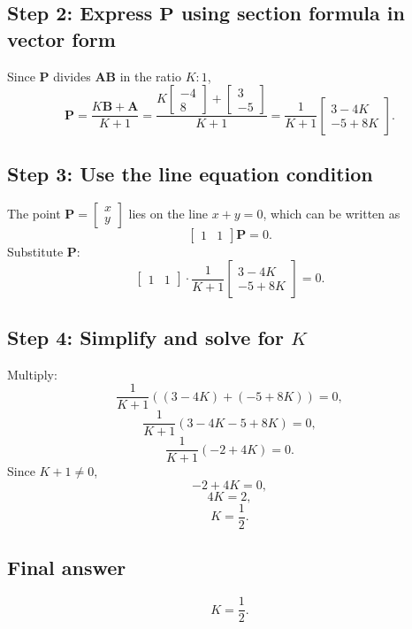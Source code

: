 \documentclass[journal]{IEEEtran}
\begin{document}
\subsection*{\textbf{Step 2: Express \(\mathbf{P}\) using section formula in vector form}}
Since \(\mathbf{P}\) divides \(\mathbf{AB}\) in the ratio \(K : 1\), 
\[
\mathbf{P} = \frac{K \mathbf{B} + \mathbf{A}}{K + 1} = \frac{K \begin{bmatrix} -4 \\ 8 \end{bmatrix} + \begin{bmatrix} 3 \\ -5 \end{bmatrix}}{K + 1} = \frac{1}{K+1} \begin{bmatrix} 3 - 4K \\ -5 + 8K \end{bmatrix}.
\]

\subsection*{\textbf{Step 3: Use the line equation condition}}
The point \(\mathbf{P} = \begin{bmatrix} x \\ y \end{bmatrix}\) lies on the line \(x + y = 0\), which can be written as
\[
\begin{bmatrix} 1 & 1 \end{bmatrix} \mathbf{P} = 0.
\]
Substitute \(\mathbf{P}\):
\[
\begin{bmatrix} 1 & 1 \end{bmatrix} \cdot \frac{1}{K+1} \begin{bmatrix} 3 - 4K \\ -5 + 8K \end{bmatrix} = 0.
\]

\subsection*{\textbf{Step 4: Simplify and solve for \(K\)}}
Multiply:
\[
\frac{1}{K+1} \left( (3 - 4K) + (-5 + 8K) \right) = 0,
\]
\[
\frac{1}{K+1} (3 - 4K - 5 + 8K) = 0,
\]
\[
\frac{1}{K+1} (-2 + 4K) = 0.
\]
Since \(K + 1 \neq 0\), 
\[
-2 + 4K = 0,
\]
\[
4K = 2,
\]
\[
K = \frac{1}{2}.
\]

\subsection*{\textbf{Final answer}}
\[
\boxed{K = \frac{1}{2}}.
\]
\end{document}
